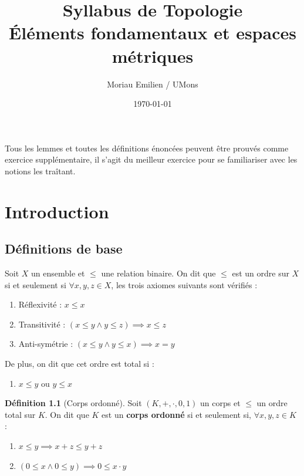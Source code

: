 \documentclass[12pt, a4paper]{report}
\title{\Huge\bfseries Syllabus de Topologie\\ \vspace{0.5cm} \Large Éléments fondamentaux et espaces métriques}
\author{\Large Moriau Emilien / UMons}
\date{\vfill\today}
\theoremstyle{definition}
\newtheorem{definition}{Définition}[chapter]
\begin{document}
\begin{titlepage}
    \centering
    \vfill
    {\vfill}
    {\makeatletter\@title\makeatother}
    \vfill
    {\makeatletter\@author\makeatother}
    \vfill
    {\makeatletter\@date\makeatother}
\end{titlepage}

\newpage
\tableofcontents
\newpage
Tous les lemmes et toutes les définitions énoncées peuvent être prouvés comme exercice supplémentaire, il s'agit du meilleur exercice pour se familiariser avec les notions les traîtant.

\chapter{Introduction}
\section{Définitions de base}
Soit $X$ un ensemble et $\le$ une relation binaire. On dit que $\le$ est un ordre sur $X$ si et seulement si $\forall x, y, z \in X$, les trois axiomes suivants sont vérifiés :
\begin{enumerate}
	\item Réflexivité : $x \le x$
	\item Transitivité : $(x \le y \land y \le z) \implies x \le z$
	\item Anti-symétrie : $(x \le y \land y \le x) \implies x = y$
\end{enumerate}
De plus, on dit que cet ordre est total si :
\begin{enumerate}
	\item[4.] $x \le y$ ou $y \le x$
\end{enumerate}

\begin{definition}[Corps ordonné]
Soit $(K, +, \cdot, 0, 1)$ un corps et $\le$ un ordre total sur $K$. On dit que $K$ est un \textbf{corps ordonné} si et seulement si, $\forall x, y, z \in K$ :
\begin{enumerate}
	\item $x \le y \implies x+z \le y+z$
	\item $(0 \le x \land 0 \le y) \implies 0 \le x \cdot y$
\end{enumerate}
\end{definition}
\end{document}
